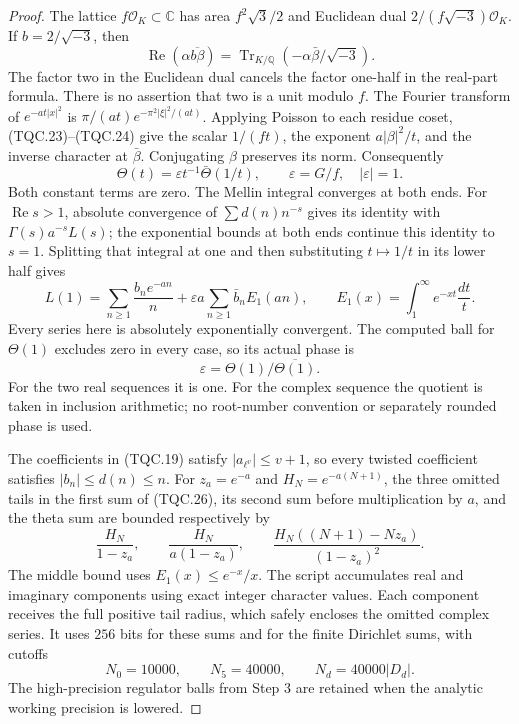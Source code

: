 \begin{proof}
The lattice $f\mathcal O_K\subset\mathbb C$ has area
$f^2\sqrt3/2$ and Euclidean dual
$2/(f\sqrt{-3})\mathcal O_K$.
If $b=2/\sqrt{-3}$, then
\[
 \operatorname{Re}(\alpha\overline{b\beta})
       =\operatorname{Tr}_{K/\mathbb Q}
                        (-\alpha\bar\beta/\sqrt{-3}).
 \tag{TQC.24}
\]
The factor two in the Euclidean dual cancels the factor one-half
in the real-part formula.  There is no assertion that two is a unit
modulo $f$.
The Fourier transform of $e^{-at|x|^2}$ is
$\pi/(at)e^{-\pi^2|\xi|^2/(at)}$.
Applying Poisson to each residue coset, (TQC.23)--(TQC.24) give
the scalar $1/(ft)$, the exponent $a|\beta|^2/t$, and the inverse
character at $\bar\beta$.  Conjugating $\beta$ preserves its norm.
Consequently
\[
 \Theta(t)=\varepsilon t^{-1}\bar\Theta(1/t),\qquad
                   \varepsilon=G/f,\quad |\varepsilon|=1.
 \tag{TQC.25}
\]
Both constant terms are zero.  The Mellin integral converges at
both ends.  For $\operatorname{Re}s>1$, absolute convergence of
$\sum d(n)n^{-s}$ gives its identity with
$\Gamma(s)a^{-s}L(s)$; the exponential bounds at both ends continue
this identity to $s=1$.  Splitting that integral at one and then
substituting $t\mapsto1/t$ in its lower half gives
\[
 L(1)=\sum_{n\ge1}\frac{b_n e^{-an}}n
       +\varepsilon a\sum_{n\ge1}\bar b_n E_1(an),
 \qquad E_1(x)=\int_1^\infty e^{-xt}\frac{dt}{t}.
 \tag{TQC.26}
\]
Every series here is absolutely exponentially convergent.
The computed ball for $\Theta(1)$ excludes zero in every case,
so its actual phase is
\[
                    \varepsilon=\Theta(1)/\overline{\Theta(1)}.
 \tag{TQC.27}
\]
For the two real sequences it is one.  For the complex sequence
the quotient is taken in inclusion arithmetic; no root-number
convention or separately rounded phase is used.

The coefficients in (TQC.19) satisfy $|a_{\ell^v}|\le v+1$,
so every twisted coefficient satisfies $|b_n|\le d(n)\le n$.
For $z_a=e^{-a}$ and $H_N=e^{-a(N+1)}$, the three omitted tails
in the first sum of (TQC.26), its second sum before multiplication
by $a$, and the theta sum are bounded respectively by
\[
 \frac{H_N}{1-z_a},\qquad
 \frac{H_N}{a(1-z_a)},\qquad
 \frac{H_N((N+1)-Nz_a)}{(1-z_a)^2}.
 \tag{TQC.28}
\]
The middle bound uses $E_1(x)\le e^{-x}/x$.
The script accumulates real and imaginary components using exact
integer character values.  Each component receives the full positive
tail radius, which safely encloses the omitted complex series.
It uses $256$ bits for these sums and for the finite Dirichlet sums,
with cutoffs
\[
              N_0=10000,\qquad N_5=40000,
                         \qquad N_d=40000|D_d|.
 \tag{TQC.29}
\]
The high-precision regulator balls from Step 3 are retained when
the analytic working precision is lowered.


\end{proof}
